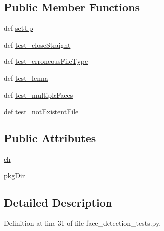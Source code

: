 \subsection*{Public Member Functions}
\begin{DoxyCompactItemize}
\item 
def \hyperlink{classface__detection__tests_1_1FaceDetectionTests_a0ec9680e6341eb21d0871d1db61961c6}{set\-Up}
\item 
def \hyperlink{classface__detection__tests_1_1FaceDetectionTests_a27cdef17385b598faaa335ee2a421845}{test\-\_\-close\-Straight}
\item 
def \hyperlink{classface__detection__tests_1_1FaceDetectionTests_ad0088eaf1361843933aed780c1cb64c8}{test\-\_\-erroneous\-File\-Type}
\item 
def \hyperlink{classface__detection__tests_1_1FaceDetectionTests_a9553a332ee0c5d6f70b191b93875830e}{test\-\_\-lenna}
\item 
def \hyperlink{classface__detection__tests_1_1FaceDetectionTests_a1b22da4a795b39b7744d7966eff557d6}{test\-\_\-multiple\-Faces}
\item 
def \hyperlink{classface__detection__tests_1_1FaceDetectionTests_a17246057da1dc7ae08fb65ce8a9e24b4}{test\-\_\-not\-Existent\-File}
\end{DoxyCompactItemize}
\subsection*{Public Attributes}
\begin{DoxyCompactItemize}
\item 
\hyperlink{classface__detection__tests_1_1FaceDetectionTests_a5e113303f4649f34aef55c80e67b92f3}{ch}
\item 
\hyperlink{classface__detection__tests_1_1FaceDetectionTests_af669feda8639f620ec79aa5793fc46e7}{pkg\-Dir}
\end{DoxyCompactItemize}


\subsection{Detailed Description}


Definition at line 31 of file face\-\_\-detection\-\_\-tests.\-py.



